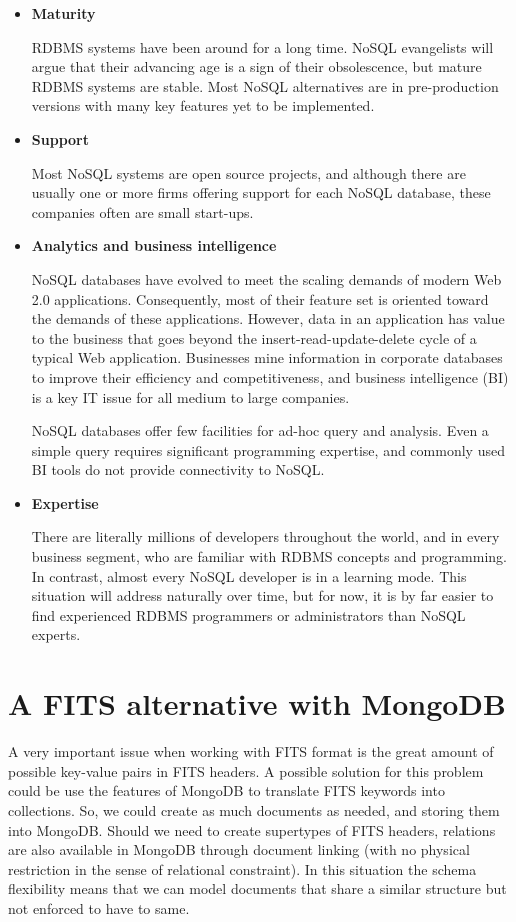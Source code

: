 \begin{itemize}

\item \textbf{Maturity}

RDBMS systems have been around for a long time. NoSQL evangelists will argue that their advancing age is a sign of their obsolescence, but mature RDBMS systems are stable. Most NoSQL alternatives are in pre-production versions with many key features yet to be implemented.

\item \textbf{Support}

Most NoSQL systems are open source projects, and although there are usually one or more firms offering support for each NoSQL database, these companies often are small start-ups.
 
\item \textbf{Analytics and business intelligence}

NoSQL databases have evolved to meet the scaling demands of modern Web 2.0 applications. Consequently, most of their feature set is oriented toward the demands of these applications. However, data in an application has value to the business that goes beyond the insert-read-update-delete cycle of a typical Web application. Businesses mine information in corporate databases to improve their efficiency and competitiveness, and business intelligence (BI) is a key IT issue for all medium to large companies.

NoSQL databases offer few facilities for ad-hoc query and analysis. Even a simple query requires significant programming expertise, and commonly used BI tools do not provide connectivity to NoSQL.

\item \textbf{Expertise}

There are literally millions of developers throughout the world, and in every business segment, who are familiar with RDBMS concepts and programming. In contrast, almost every NoSQL developer is in a learning mode. This situation will address naturally over time, but for now, it is by far easier to find experienced RDBMS programmers or administrators than NoSQL experts.

\end{itemize}


\section{A FITS alternative with MongoDB}

A very important issue when working with FITS format is the great amount of possible key-value pairs in FITS headers. A possible solution for this problem could be use the features of MongoDB to translate FITS keywords into collections. So, we could create as much documents as needed, and storing them into MongoDB. Should we need to create supertypes of FITS headers, relations are also available in MongoDB through document linking (with no physical restriction in the sense of relational constraint). In this situation the schema flexibility means that we can model documents that share a similar structure but not enforced to have to same.


